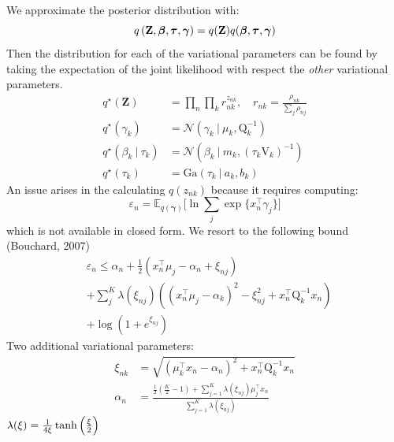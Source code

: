 \documentclass[a0paper,portrait]{baposter}
\newcommand{\tr}{\intercal}
\newcommand\given[1][]{\:#1\vert\:}
\newcommand{\boldbeta}{\boldsymbol\beta}
\newcommand{\boldgamma}{\boldsymbol\gamma}
\newcommand{\boldtau}{\boldsymbol\tau}
\newcommand{\pr}[1]{p \left( #1 \right)}
\begin{document}
\begin{poster}
{%
We approximate the posterior distribution with: \vspace{-3mm}
$$q \left( \mathbf{Z}, \boldbeta, \boldtau, \boldgamma \right) = q(\mathbf{Z}) q(\boldbeta, \boldtau, \boldgamma) \vspace{-1mm}$$
Then the distribution for each of the variational parameters can be found by taking the expectation of the joint likelihood with respect the \textit{other} variational parameters. 
\vspace{-2mm}
\setlength{\belowdisplayskip}{1.3pt}%
\begin{align*}
	q^{\star}(\mathbf{Z}) &= \prod_{n} \prod_{k} r_{nk}^{z_{nk}}, \quad r_{nk} = \frac{\rho_{nk}}{\sum_{j} \rho_{nj}} \\
 	q^{\star}(\gamma_k) &= \mathcal{N} \left(\gamma_k \given \mu_k, \mathrm{Q}_k^{-1} \right) \\
 	q^{\star}(\beta_k \given \tau_k) &= \mathcal{N}\left(\beta_k \given m_k, (\tau_k \mathrm{V}_k)^{-1} \right) \\
 	q^{\star}(\tau_k) &=  \mathrm{Ga}\left( \tau_k \given a_k, b_k \right)
\end{align*} 
An issue arises in the calculating $q(z_{nk})$ because it requires computing: \vspace{-3mm}
$$\varepsilon_n = \mathbb{E}_{q(\boldsymbol\gamma)}\Bigg[\ln \sum_{j} \exp \{ x_n^{\tr} \gamma_j \}\Bigg]$$
which is not available in closed form. We resort to the following bound (Bouchard, 2007)  \vspace{-2mm}
\setlength{\belowdisplayskip}{8pt}%
\begin{align*}
	& \varepsilon_n  \leq  \alpha_n + \frac{1}{2}\left(x_n^{\tr}\mu_j - \alpha_n + \xi_{nj}\right) \\[0.05ex] 
	& + \sum_{j}^K  \lambda(\xi_{nj}) \left( (x_n^{\tr} \mu_j - \alpha_k)^2 - \xi_{nj}^2 + x_n^{\tr} \mathrm{Q}_k^{-1} x_n \right) \\[0.05ex] 
	& + \log( 1 + e^{\xi_{nj}}) 
\end{align*}
Two additional variational parameters: \vspace{-1mm}
\setlength{\belowdisplayskip}{3pt}%
\begin{align*}
    \xi_{nk} & = \sqrt{\left(\mu_k^{\intercal}x_n - \alpha_n \right)^2 + x_n^{\intercal} \mathrm{Q}_k^{-1} x_n} \\[0.9ex]
    \alpha_n & = \frac{\frac{1}{2}\left( \frac{K}{2} - 1\right) + \sum_{j = 1}^K \lambda \left( \xi_{nj} \right)\mu_j^{\intercal} x_n}{\sum_{j=1}^{K} \lambda \left( \xi_{nj}\right)} 
\end{align*}
$\vspace{-2mm} \lambda(\xi) = \frac{1}{4\xi} \tanh \left( \frac{\xi}{2} \right)$ \\

}
\end{poster}
\end{document}

